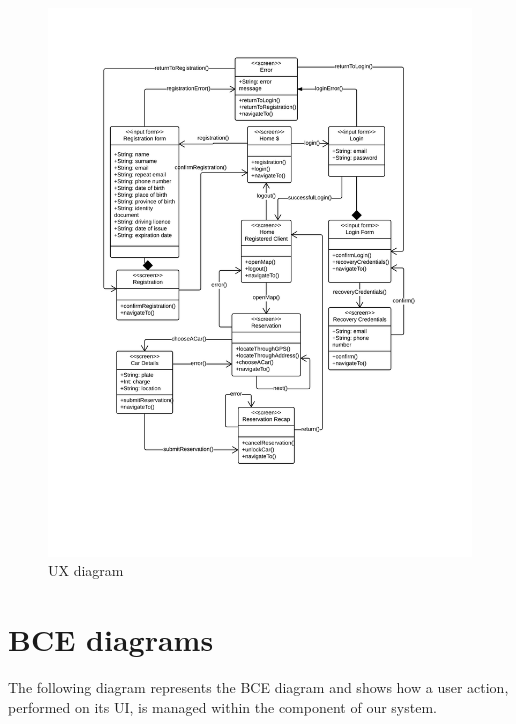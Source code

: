 \begin{figure}[H]
\includegraphics[width=\textwidth, keepaspectratio]{../images/diagrams/ux.png}
\caption{UX diagram}
\end{figure}

\section{BCE diagrams}
The following diagram represents the BCE diagram and shows how a user action, performed on its UI, is managed within the component of our system.

